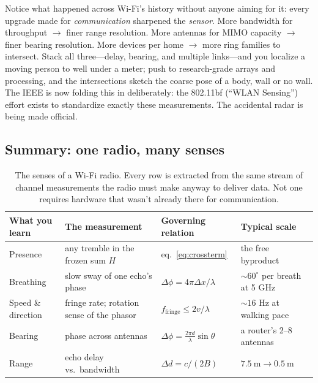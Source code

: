 \documentclass[11pt, letterpaper]{article}
\begin{document}
Notice what happened across Wi-Fi's history without anyone aiming for it: every upgrade made for \textit{communication} sharpened the \textit{sensor}. More bandwidth for throughput $\to$ finer range resolution. More antennas for MIMO capacity $\to$ finer bearing resolution. More devices per home $\to$ more ring families to intersect. Stack all three---delay, bearing, and multiple links---and you localize a moving person to well under a meter; push to research-grade arrays and processing, and the intersections sketch the coarse pose of a body, wall or no wall. The IEEE is now folding this in deliberately: the 802.11bf (``WLAN Sensing'') effort exists to standardize exactly these measurements. The accidental radar is being made official.

\subsection{Summary: one radio, many senses}

\begin{table}[H]
\centering
\renewcommand{\arraystretch}{1.35}
\begin{tabular}{@{}>{\raggedright}p{2.5cm} p{3.6cm} p{3.3cm} p{3.6cm}@{}}
\toprule
\textbf{What you learn} & \textbf{The measurement} & \textbf{Governing relation} & \textbf{Typical scale} \\
\midrule
Presence & any tremble in the frozen sum $H$ & eq.~\eqref{eq:crossterm} & the free byproduct \\
Breathing & slow sway of one echo's phase & $\Delta\phi = 4\pi\Delta x/\lambda$ & $\sim 60^\circ$ per breath at 5 GHz \\
Speed \& direction & fringe rate; rotation sense of the phasor & $f_{\text{fringe}} \le 2v/\lambda$ & $\sim 16$ Hz at walking pace \\
Bearing & phase across antennas & $\Delta\phi = \tfrac{2\pi d}{\lambda}\sin\theta$ & a router's 2--8 antennas \\
Range & echo delay vs.\ bandwidth & $\Delta d = c/(2B)$ & $7.5\ \text{m} \to 0.5\ \text{m}$ \\
\bottomrule
\end{tabular}
\caption{The senses of a Wi-Fi radio. Every row is extracted from the same stream of channel measurements the radio must make anyway to deliver data. Not one requires hardware that wasn't already there for communication.}
\label{tab:summary}
\end{table}

\end{document}
